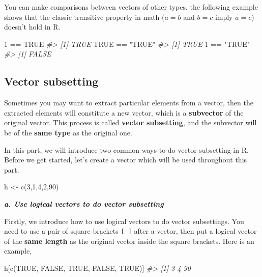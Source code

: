 \documentclass[
]{book}
\newenvironment{Shaded}{\begin{snugshade}}{\end{snugshade}}
\newcommand{\CommentTok}[1]{\textcolor[rgb]{0.56,0.35,0.01}{\textit{#1}}}
\newcommand{\ConstantTok}[1]{\textcolor[rgb]{0.00,0.00,0.00}{#1}}
\newcommand{\DecValTok}[1]{\textcolor[rgb]{0.00,0.00,0.81}{#1}}
\newcommand{\FunctionTok}[1]{\textcolor[rgb]{0.00,0.00,0.00}{#1}}
\newcommand{\NormalTok}[1]{#1}
\newcommand{\OtherTok}[1]{\textcolor[rgb]{0.56,0.35,0.01}{#1}}
\newcommand{\SpecialCharTok}[1]{\textcolor[rgb]{0.00,0.00,0.00}{#1}}
\newcommand{\StringTok}[1]{\textcolor[rgb]{0.31,0.60,0.02}{#1}}
\begin{document}
You can make comparisons between vectors of other types, the following example shows that the classic transitive property in math (\(a=b\) and \(b=c\) imply \(a=c\)) doesn't hold in R.

\begin{Shaded}
\begin{Highlighting}[]
\DecValTok{1} \SpecialCharTok{==} \ConstantTok{TRUE}
\CommentTok{\#\textgreater{} [1] TRUE}
\ConstantTok{TRUE} \SpecialCharTok{==} \StringTok{"TRUE"}   
\CommentTok{\#\textgreater{} [1] TRUE}
\DecValTok{1} \SpecialCharTok{==} \StringTok{"TRUE"}
\CommentTok{\#\textgreater{} [1] FALSE}
\end{Highlighting}
\end{Shaded}

\hypertarget{vector-subsetting}{%
\subsection{Vector subsetting}\label{vector-subsetting}}

Sometimes you may want to extract particular elements from a vector, then the extracted elements will constitute a new vector, which is a \textbf{subvector} of the original vector. This process is called \textbf{vector subsetting}, and the subvector will be of the \textbf{same type} as the original one.

In this part, we will introduce two common ways to do vector subsetting in R. Before we get started, let's create a vector which will be used throughout this part.

\begin{Shaded}
\begin{Highlighting}[]
\NormalTok{h }\OtherTok{\textless{}{-}} \FunctionTok{c}\NormalTok{(}\DecValTok{3}\NormalTok{,}\DecValTok{1}\NormalTok{,}\DecValTok{4}\NormalTok{,}\DecValTok{2}\NormalTok{,}\DecValTok{90}\NormalTok{)}
\end{Highlighting}
\end{Shaded}

\textbf{\emph{a. Use logical vectors to do vector subsetting}}

Firstly, we introduce how to use logical vectors to do vector subsettings. You need to use a pair of square brackets \texttt{{[}\ {]}} after a vector, then put a logical vector of the \textbf{same length} as the original vector inside the square brackets. Here is an example,

\begin{Shaded}
\begin{Highlighting}[]
\NormalTok{h[}\FunctionTok{c}\NormalTok{(}\ConstantTok{TRUE}\NormalTok{, }\ConstantTok{FALSE}\NormalTok{, }\ConstantTok{TRUE}\NormalTok{, }\ConstantTok{FALSE}\NormalTok{, }\ConstantTok{TRUE}\NormalTok{)]}
\CommentTok{\#\textgreater{} [1]  3  4 90}
\end{Highlighting}
\end{Shaded}
\end{document}
